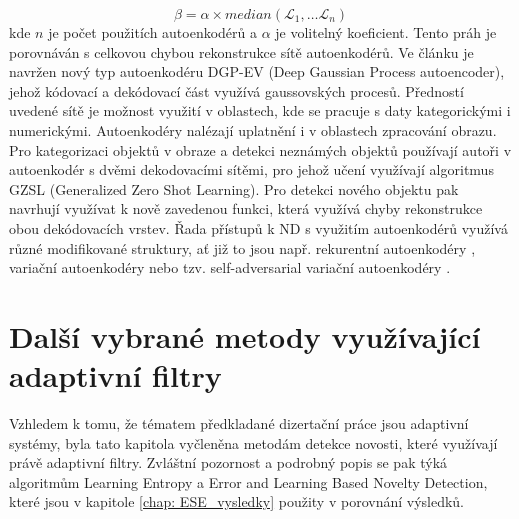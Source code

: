 \begin{equation}
\beta = \alpha \times median(\mathcal{L}_1,\dots \mathcal{L}_n)
\end{equation}
kde $n$ je počet použitích autoenkodérů a $\alpha$ je volitelný koeficient.  Tento práh je porovnáván s celkovou chybou rekonstrukce sítě autoenkodérů.
Ve článku \cite{auto5} je navržen nový typ autoenkodéru DGP-EV (Deep Gaussian Process autoencoder), jehož kódovací a dekódovací část využívá gaussovských procesů. Předností uvedené sítě je možnost využití v oblastech, kde se pracuje s daty kategorickými i numerickými. Autoenkodéry nalézají uplatnění i v oblastech zpracování obrazu. Pro kategorizaci objektů v obraze a detekci neznámých objektů používají autoři v \cite{auto6} autoenkodér s dvěmi dekodovacími sítěmi, pro jehož učení využívají algoritmus GZSL (Generalized Zero Shot Learning). Pro detekci nového objektu pak navrhují využívat k nově zavedenou funkci, která využívá chyby rekonstrukce obou dekódovacích vrstev. Řada přístupů k ND s využitím autoenkodérů využívá různé modifikované struktury, ať již to jsou např. rekurentní autoenkodéry \cite{auto7,auto8}, variační autoenkodéry \cite{auto9} nebo tzv. self-adversarial variační autoenkodéry \cite{auto10}.


\section{Další vybrané metody využívající adaptivní filtry}
Vzhledem k tomu, že tématem předkladané dizertační práce jsou adaptivní systémy, byla tato kapitola vyčleněna metodám detekce novosti, které využívají právě adaptivní filtry. Zvláštní pozornost a podrobný popis se pak týká algoritmům Learning Entropy a Error and Learning Based Novelty Detection, které jsou v kapitole \ref{chap: ESE_vysledky} použity v porovnání výsledků.
